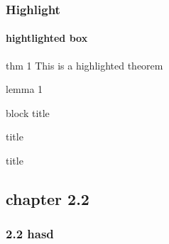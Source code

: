 \documentclass[12pt]{beamer}
\begin{document}
\begin{frame}
\frametitle{Highlight}
\framesubtitle{hightlighted box}

\begin{block}{thm 1}
		This is a highlighted theorem
\end{block}


\begin{block}{lemma 1}
\end{block}



\begin{block}{ block title}
\end{block}

\begin{alertblock}{  title}
\end{alertblock}
\begin{example}{  title}
\end{example}



\end{frame}



\subsection{chapter 2.2}

\begin{frame}
\frametitle{2.2 hasd}
\framesubtitle{}

\end{frame}
\end{document}
